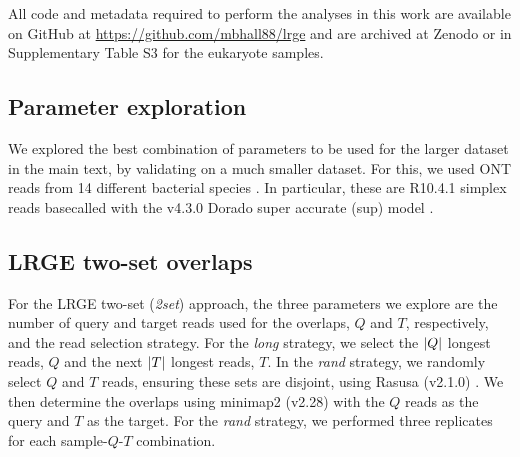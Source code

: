\documentclass[unnumsec,webpdf,modern,large]{oup-authoring-template}
\theoremstyle{thmstyleone}%
\theoremstyle{thmstyletwo}%
\theoremstyle{thmstylethree}%
\DeclarePairedDelimiter\size{\lvert}{\rvert}
\newcommand{\lrge}{LRGE}
\newcommand{\twoset}{\textit{2set}}
\begin{document}
All code and metadata required to perform the analyses in this work are available on GitHub at \url{https://github.com/mbhall88/lrge} and are archived at Zenodo \citep{hall_2025_17183812} or in Supplementary Table S3 for the eukaryote samples.





\begin{appendices}
\renewcommand{\thefigure}{S\arabic{figure}}
\setcounter{figure}{0}

\section{Parameter exploration}\label{app:param_explore}

We explored the best combination of parameters to be used for the larger dataset in the main text, by validating on a much smaller dataset. For this, we used ONT reads from 14 different bacterial species \citep{hall_benchmarking_2024}. In particular, these are R10.4.1 simplex reads basecalled with the v4.3.0 Dorado super accurate (sup) model \citep{dorado}. 


\subsection{\lrge{} two-set overlaps}\label{app:param_lrge_2set}

For the \lrge{} two-set (\twoset{}) approach, the three parameters we explore are the number of query and target reads used for the overlaps, $Q$ and $T$, respectively, and the read selection strategy. For the \textit{long} strategy, we select the $\size{Q}$ longest reads, $Q$ and the next $\size{T}$ longest reads, $T$. In the \textit{rand} strategy, we randomly select $Q$ and $T$ reads, ensuring these sets are disjoint, using Rasusa (v2.1.0) \citep{hall_rasusa_2022}. We then determine the overlaps using minimap2 (v2.28) \citep{li_minimap2_2018} with the $Q$ reads as the query and $T$ as the target. For the \textit{rand} strategy, we performed three replicates for each sample-$Q$-$T$ combination.


\end{appendices}
\end{document}
